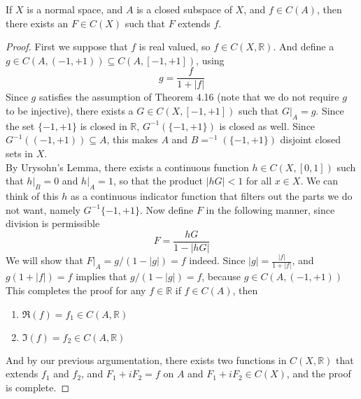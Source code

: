 \documentclass[../../main.tex]{subfiles}
\begin{document}
\begin{wts}
If $X$ is a normal space, and $A$ is a closed subspace of $X$, and $f\in C(A)$, then there exists an $F\in C(X)$ such that $F$ extends $f$.
\end{wts}
\begin{proof}
First we suppose that $f$ is real valued, so $f\in C(X, \mathbb{R})$. And define a $g\in C(A, (-1, +1))\subseteq C(A, [-1,+1])$, using
\[
g= \dfrac{f}{1+|f|}
\]
Since $g$ satisfies the assumption of Theorem 4.16 (note that we do not require $g$ to be injective), there exists a $G\in C(X, [-1, +1])$ such that $G|_A = g$. Since the set $\{-1,+1\}$ is closed in $\mathbb{R}$, $G^{-1}(\{-1,+1\})$ is closed as well. Since $G^{-1}((-1,+1))\subseteq A$, this makes $A$ and $B=^{-1}(\{-1,+1\})$ disjoint closed sets in $X$.\\

By Urysohn's Lemma, there exists a continuous function $h\in C(X, [0,1])$ such that $h|_B = 0$ and $h|_A =1$, so that the product $|hG|< 1$ for all $x\in X$. We can think of this $h$ as a continuous indicator function that filters out the parts we do not want, namely $G^{-1}\{-1,+1\}$. Now define $F$ in the following manner, since division is permissible
\[
F = \dfrac{hG}{1-|hG|}
\]
We will show that $F|_A = g/(1-|g|) = f$ indeed. Since $|g| = \frac{|f|}{1+|f|}$, and $g(1+|f|) = f$ implies that $g/(1-|g|) = f$, because $g\in C(A,(-1,+1))$ This completes the proof for any $f\in\mathbb{R}$ if $f\in C(A)$, then
\begin{enumerate}
    \item $\Re(f) = f_1\in C(A,\mathbb{R})$
    \item $\Im(f) = f_2\in C(A,\mathbb{R})$
\end{enumerate}
And by our previous argumentation, there exists two functions in $C(X, \mathbb{R})$ that extends $f_1$ and $f_2$, and $F_1 + iF_2 = f$ on $A$ and $F_1 + iF_2\in C(X)$, and the proof is complete.
\end{proof}
\end{document}
